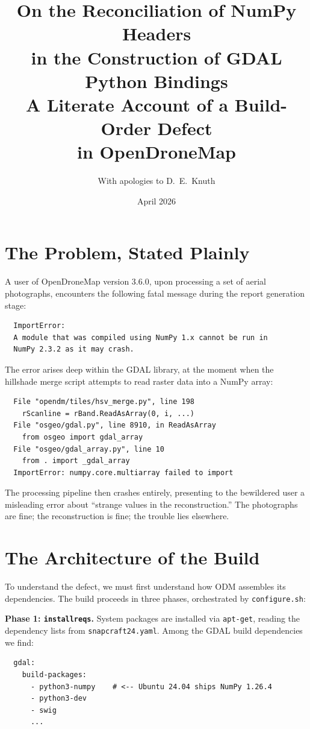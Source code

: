 \documentclass{article}
\title{On the Reconciliation of NumPy Headers\\
  in the Construction of GDAL Python Bindings\\[6pt]
  \large A Literate Account of a Build-Order Defect\\
  in OpenDroneMap}
\author{With apologies to D.~E.~Knuth}
\date{April 2026}
\begin{document}
\maketitle

\section{The Problem, Stated Plainly}

A user of OpenDroneMap version 3.6.0, upon processing a set of aerial
photographs, encounters the following fatal message during the report
generation stage:

\begin{verbatim}
  ImportError:
  A module that was compiled using NumPy 1.x cannot be run in
  NumPy 2.3.2 as it may crash.
\end{verbatim}

\noindent The error arises deep within the GDAL library, at the moment when
the hillshade merge script attempts to read raster data into a NumPy
array:

\begin{verbatim}
  File "opendm/tiles/hsv_merge.py", line 198
    rScanline = rBand.ReadAsArray(0, i, ...)
  File "osgeo/gdal.py", line 8910, in ReadAsArray
    from osgeo import gdal_array
  File "osgeo/gdal_array.py", line 10
    from . import _gdal_array
  ImportError: numpy.core.multiarray failed to import
\end{verbatim}

\noindent The processing pipeline then crashes entirely, presenting to the
bewildered user a misleading error about ``strange values in the
reconstruction.''  The photographs are fine; the reconstruction is
fine; the trouble lies elsewhere.

\section{The Architecture of the Build}

To understand the defect, we must first understand how ODM assembles
its dependencies.  The build proceeds in three phases, orchestrated by
\texttt{configure.sh}:

\medskip
\noindent\textbf{Phase 1: \texttt{installreqs}.} System packages are
installed via \texttt{apt-get}, reading the dependency lists from
\texttt{snapcraft24.yaml}.  Among the GDAL build dependencies we find:

\begin{verbatim}
  gdal:
    build-packages:
      - python3-numpy    # <-- Ubuntu 24.04 ships NumPy 1.26.4
      - python3-dev
      - swig
      ...
\end{verbatim}
\end{document}
